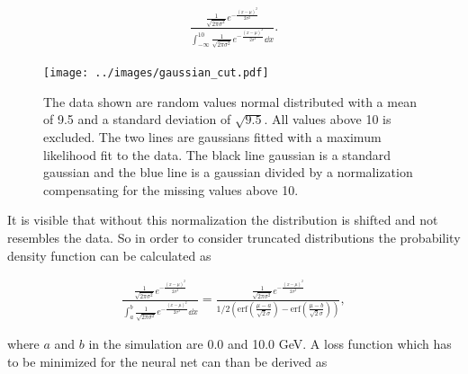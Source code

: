 \documentclass[12pt, a4paper]{thesis}
\begin{document}
\begin{align}
\frac{\frac{1}{\sqrt{2\pi \sigma^2}} e^{-\frac{(x-\mu)^2}{2
      \sigma^2}}}{\int^{10}_{-\infty} \frac{1}{\sqrt{2\pi \sigma^2}}
  e^{-\frac{(x-\mu)^2}{2 \sigma^2}} \dd x}.
\end{align}

\begin{figure}[H]
  \centering
  \texttt{[image: ../images/gaussian\_cut.pdf]}
  \caption{The data shown are random values normal distributed with a
    mean of 9.5 and a standard deviation of $\sqrt{9.5}$. All values
    above 10 is excluded. The two lines are gaussians fitted with a
    maximum likelihood fit to the data. The black line gaussian is a
    standard gaussian and the blue line is a gaussian divided by a
    normalization compensating for the missing values above 10.}
  \label{gaussian-cut}
\end{figure}


It is visible that without this normalization the distribution is
shifted and not resembles the data. So in order to consider truncated
distributions the probability density function can be calculated as

\begin{align}
\frac{\frac{1}{\sqrt{2\pi \sigma^2}}
  e^{-\frac{(x-\mu)^2}{2 \sigma^2}}}{\int^b_a \frac{1}{\sqrt{2\pi
      \sigma^2}} e^{-\frac{(x-\mu)^2}{2 \sigma^2}} \dd x} =
\frac{\frac{1}{\sqrt{2\pi \sigma^2}} e^{-\frac{(x-\mu)^2}{2
      \sigma^2}}}{1/2\left(\text{erf}\left(\frac{\mu-a}{\sqrt{2}\sigma}\right)
  - \text{erf}\left(\frac{\mu-b}{\sqrt{2}\sigma}\right)\right)},
\end{align}

where \(a\) and \(b\) in the simulation are 0.0 and 10.0 GeV. A loss
function which has to be minimized for the neural net can than be
derived as
\end{document}
